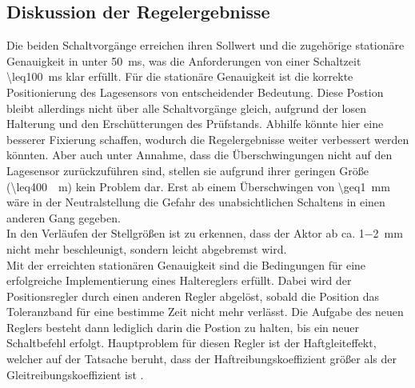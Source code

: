 \subsection{Diskussion der Regelergebnisse}\label{diskreg}
Die beiden Schaltvorgänge erreichen ihren Sollwert und die zugehörige stationäre Genauigkeit in unter \SI{50}{ms}, was die Anforderungen von einer Schaltzeit \SI{\leq100}{ms} klar erfüllt. Für die stationäre Genauigkeit ist die korrekte Positionierung des Lagesensors von entscheidender Bedeutung. Diese Postion bleibt allerdings nicht über alle Schaltvorgänge gleich, aufgrund der losen Halterung und den Erschütterungen des Prüfstands. Abhilfe könnte hier eine besserer Fixierung schaffen, wodurch die Regelergebnisse weiter verbessert werden könnten. Aber auch unter Annahme, dass die Überschwingungen nicht auf den Lagesensor zurückzuführen sind, stellen sie aufgrund ihrer geringen Größe (\SI{\leq400}{\mu m}) kein Problem dar. Erst ab einem Überschwingen von \SI{\geq1}{mm} wäre in der Neutralstellung die Gefahr des unabsichtlichen Schaltens in einen anderen Gang gegeben.\\
In den Verläufen der Stellgrößen ist zu erkennen, dass der Aktor ab ca. \SI{1-2}{mm} nicht mehr beschleunigt, sondern leicht abgebremst wird.\\
Mit der erreichten stationären Genauigkeit sind die Bedingungen für eine erfolgreiche Implementierung eines Haltereglers erfüllt. Dabei wird der Positionsregler durch einen anderen Regler abgelöst, sobald die Position das Toleranzband für eine bestimme Zeit nicht mehr verlässt. Die Aufgabe des neuen Reglers besteht dann lediglich darin die Postion zu halten, bis ein neuer Schaltbefehl erfolgt. Hauptproblem für diesen Regler ist der Haftgleiteffekt, welcher auf der Tatsache beruht, dass der Haftreibungskoeffizient größer als der Gleitreibungskoeffizient ist \cite{Bowden2001}. 

